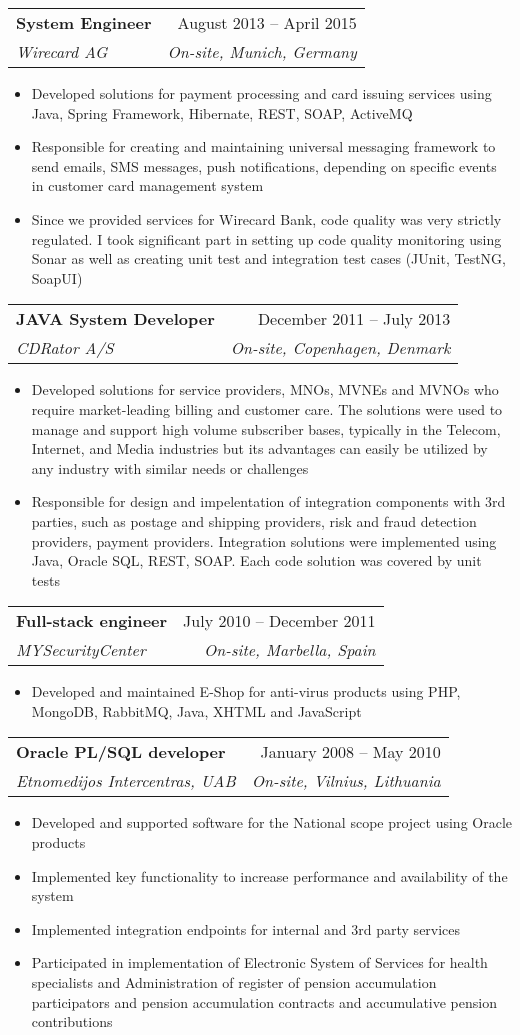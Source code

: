 \documentclass[11pt, letterpaper]{article}
\makeatletter
\newcommand{\resumeItem}[1]{
  \item\small{
    {#1 \vspace{-2pt}}
  }
}
\newcommand{\resumeSubheading}[4]{
  \vspace{-2pt}\item
    \begin{tabular*}{0.97\textwidth}[t]{l@{\extracolsep{\fill}}r}
      \textbf{#1} & #2 \\
      \textit{\small#3} & \textit{\small #4} \\
    \end{tabular*}\vspace{-7pt}
}
\newcommand{\resumeItemListStart}{\begin{itemize}}
\newcommand{\resumeItemListEnd}{\end{itemize}\vspace{-5pt}}
\makeatother
\begin{document}
    \resumeSubheading
      {System Engineer}{August 2013 -- April 2015}
      {Wirecard AG}{On-site, Munich, Germany}
      \resumeItemListStart
        \resumeItem{Developed solutions for payment processing and card issuing services using Java, Spring Framework, Hibernate, REST, SOAP, ActiveMQ}
        \resumeItem{Responsible for creating and maintaining universal messaging framework to send emails, SMS messages, push notifications, depending on specific events in customer card management system}
        \resumeItem{Since we provided services for Wirecard Bank, code quality was very strictly regulated. I took significant part in setting up code quality monitoring using Sonar as well as creating unit test and integration test cases (JUnit, TestNG, SoapUI)}
      \resumeItemListEnd

    \resumeSubheading
      {JAVA System Developer}{December 2011 -- July 2013}
      {CDRator A/S}{On-site, Copenhagen, Denmark}
      \resumeItemListStart
        \resumeItem{Developed solutions for service providers, MNOs, MVNEs and MVNOs who
require market-leading billing and customer care. The solutions were used to manage and support high volume subscriber bases, typically in the Telecom, Internet, and Media industries but its advantages can easily be utilized by any industry with similar needs or challenges}
        \resumeItem{Responsible for design and impelentation of integration components with 3rd parties, such as postage and shipping providers, risk and fraud detection providers, payment providers. Integration solutions were implemented using Java, Oracle SQL, REST, SOAP. Each code solution was covered by unit tests}
      \resumeItemListEnd

    \resumeSubheading
      {Full-stack engineer}{July 2010 -- December 2011}
      {MYSecurityCenter}{On-site, Marbella, Spain}
      \resumeItemListStart
        \resumeItem{Developed and maintained E-Shop for anti-virus products using PHP, MongoDB, RabbitMQ, Java, XHTML and JavaScript}
      \resumeItemListEnd

    \resumeSubheading
      {Oracle PL/SQL developer}{January 2008 -- May 2010}
      {Etnomedijos Intercentras, UAB}{On-site, Vilnius, Lithuania}
      \resumeItemListStart
        \resumeItem{Developed and supported software for the National scope project using Oracle products}
        \resumeItem{Implemented key functionality to increase performance and availability of the system}
        \resumeItem{Implemented integration endpoints for internal and 3rd party services}
        \resumeItem{Participated in implementation of Electronic System of Services for health specialists and Administration of register of pension accumulation participators and pension
accumulation contracts and accumulative pension contributions}
      \resumeItemListEnd
\end{document}

